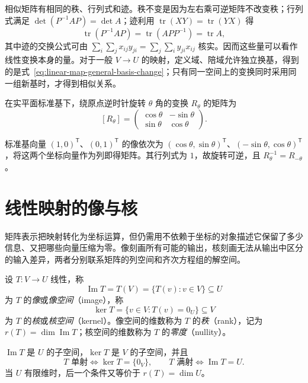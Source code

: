 相似矩阵有相同的秩、行列式和迹。秩不变是因为左右乘可逆矩阵不改变秩；行列式满足 $\det(P^{-1}AP)=\det A$；迹利用 $\operatorname{tr}(XY)=\operatorname{tr}(YX)$ 得
\[
    \operatorname{tr}(P^{-1}AP)=\operatorname{tr}(APP^{-1})=\operatorname{tr}A,
\]
其中迹的交换公式可由 $\sum_i\sum_jx_{ij}y_{ji}=\sum_j\sum_iy_{ji}x_{ij}$ 核实。因而这些量可以看作线性变换本身的量。对于一般 $V\to U$ 的映射，定义域、陪域允许独立换基，得到的是式~\eqref{eq:linear-map-general-basis-change}；只有同一空间上的变换同时采用同一组新基时，才得到相似关系。

\begin{example}
在实平面标准基下，绕原点逆时针旋转 $\theta$ 角的变换 $R_\theta$ 的矩阵为
\[
    [R_\theta]=\begin{pmatrix}
        \cos\theta&-\sin\theta\\
        \sin\theta&\cos\theta
    \end{pmatrix}.
\]
\end{example}

\begin{solve}
标准基向量 $(1,0)^{\mathsf T}$、$(0,1)^{\mathsf T}$ 的像依次为 $(\cos\theta,\sin\theta)^{\mathsf T}$、$(-\sin\theta,\cos\theta)^{\mathsf T}$，将这两个坐标向量作为列即得矩阵。其行列式为 $1$，故旋转可逆，且 $R_\theta^{-1}=R_{-\theta}$。
\end{solve}

\section{线性映射的像与核}
\label{sec:linear-map-image-kernel}

矩阵表示把映射转化为坐标运算，但仍需用不依赖于坐标的对象描述它保留了多少信息、又把哪些向量压缩为零。像刻画所有可能的输出，核刻画无法从输出中区分的输入差异，两者分别联系矩阵的列空间和齐次方程组的解空间。

\begin{definition}
\label{def:linear-map-image-kernel}
设 $T:V\to U$ 线性，称
\[
    \operatorname{Im}T=T(V)=\{T(v):v\in V\}\subseteq U
\]
为 $T$ 的\emph{像}或\emph{像空间}（image），称
\[
    \ker T=\{v\in V:T(v)=0_U\}\subseteq V
\]
为 $T$ 的\emph{核}或\emph{核空间}（kernel）。像空间的维数称为 $T$ 的\emph{秩}（rank），记为 $r(T)=\dim\operatorname{Im}T$；核空间的维数称为 $T$ 的\emph{零度}（nullity）。
\end{definition}

\begin{proposition}
\label{prop:linear-map-image-kernel-subspace}
$\operatorname{Im}T$ 是 $U$ 的子空间，$\ker T$ 是 $V$ 的子空间，并且
\[
    T\text{ 单射}\iff\ker T=\{0_V\},\qquad
    T\text{ 满射}\iff\operatorname{Im}T=U.
\]
当 $U$ 有限维时，后一个条件又等价于 $r(T)=\dim U$。
\end{proposition}

